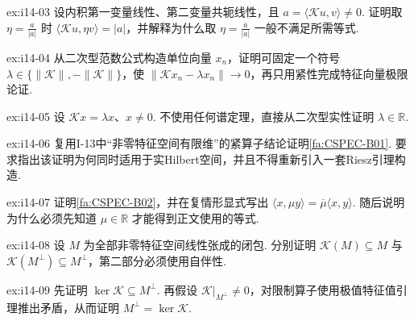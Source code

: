 \begin{FAExercise}[复相位选择]{ex:i14-03}
设内积第一变量线性、第二变量共轭线性，且 \(\displaystyle a=\langle\mathcal Ku,v\rangle\neq0\). 证明取 \(\displaystyle \eta=\frac{a}{|a|}\) 时 \(\displaystyle \langle\mathcal Ku,\eta v\rangle=|a|\)，并解释为什么取 \(\displaystyle \eta=\frac{\overline a}{|a|}\) 一般不满足所需等式.
\end{FAExercise}

\begin{FAExercise}[极值特征值]{ex:i14-04}
从二次型范数公式构造单位向量 \(\displaystyle x_n\)，证明可固定一个符号 \(\displaystyle \lambda\in\{\|\mathcal K\|,-\|\mathcal K\|\}\)，使 \(\displaystyle \|\mathcal Kx_n-\lambda x_n\|\to0\)，再只用紧性完成特征向量极限论证.
\end{FAExercise}

\begin{FAExercise}[特征值实性]{ex:i14-05}
设 \(\displaystyle \mathcal Kx=\lambda x\)、\(\displaystyle x\neq0\). 不使用任何谱定理，直接从二次型实性证明 \(\displaystyle \lambda\in\mathbb R\).
\end{FAExercise}

\begin{FAExercise}[非零特征空间有限维]{ex:i14-06}
复用I-13中“非零特征空间有限维”的紧算子结论证明\autoref{fa:CSPEC-B01}. 要求指出该证明为何同时适用于实Hilbert空间，并且不得重新引入一套Riesz引理构造.
\end{FAExercise}

\begin{FAExercise}[不同特征空间正交]{ex:i14-07}
证明\autoref{fa:CSPEC-B02}，并在复情形显式写出 \(\displaystyle \langle x,\mu y\rangle=\overline\mu\langle x,y\rangle\). 随后说明为什么必须先知道 \(\displaystyle \mu\in\mathbb R\) 才能得到正文使用的等式.
\end{FAExercise}

\begin{FAExercise}[正交补的不变性]{ex:i14-08}
设 \(\displaystyle M\) 为全部非零特征空间线性张成的闭包. 分别证明 \(\displaystyle \mathcal K(M)\subseteq M\) 与 \(\displaystyle \mathcal K(M^\perp)\subseteq M^\perp\)，第二部分必须使用自伴性.
\end{FAExercise}

\begin{FAExercise}[核与非零特征张成]{ex:i14-09}
先证明 \(\displaystyle \ker\mathcal K\subseteq M^\perp\). 再假设 \(\displaystyle \mathcal K|_{M^\perp}\neq0\)，对限制算子使用极值特征值引理推出矛盾，从而证明 \(\displaystyle M^\perp=\ker\mathcal K\).
\end{FAExercise}

